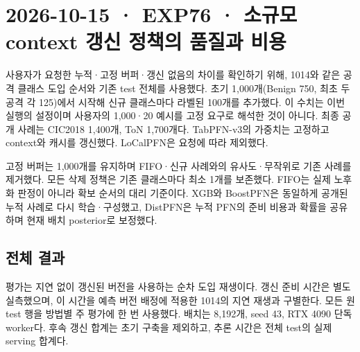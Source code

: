 \section{2026-10-15 · EXP76 · 소규모 context 갱신 정책의 품질과 비용}
\label{report:20261015_exp76_results}
사용자가 요청한 누적·고정 버퍼·갱신 없음의 차이를 확인하기 위해, 1014와 같은 공격 클래스 도입 순서와 기존 test 전체를 사용했다. 초기 1,000개(Benign 750, 최초 두 공격 각 125)에서 시작해 신규 클래스마다 라벨된 100개를 추가했다. 이 수치는 이번 실행의 설정이며 사용자의 1,000·20 예시를 고정 요구로 해석한 것이 아니다. 최종 공개 사례는 CIC2018 1,400개, ToN 1,700개다. TabPFN-v3의 가중치는 고정하고 context와 캐시를 갱신했다. LoCalPFN은 요청에 따라 제외했다.

고정 버퍼는 1,000개를 유지하며 FIFO·신규 사례와의 유사도·무작위로 기존 사례를 제거했다. 모든 삭제 정책은 기존 클래스마다 최소 1개를 보존했다. FIFO는 실제 노후화 판정이 아니라 확보 순서의 대리 기준이다. XGB와 BoostPFN은 동일하게 공개된 누적 사례로 다시 학습·구성했고, DistPFN은 누적 PFN의 준비 비용과 확률을 공유하며 현재 배치 posterior로 보정했다.

\subsection{전체 결과}
평가는 지연 없이 갱신된 버전을 사용하는 순차 도입 재생이다. 갱신 준비 시간은 별도 실측했으며, 이 시간을 예측 버전 배정에 적용한 1014의 지연 재생과 구별한다. 모든 원 test 행을 방법별 주 평가에 한 번 사용했다. 배치는 8,192개, seed 43, RTX 4090 단독 worker다. 후속 갱신 합계는 초기 구축을 제외하고, 추론 시간은 전체 test의 실제 serving 합계다.

